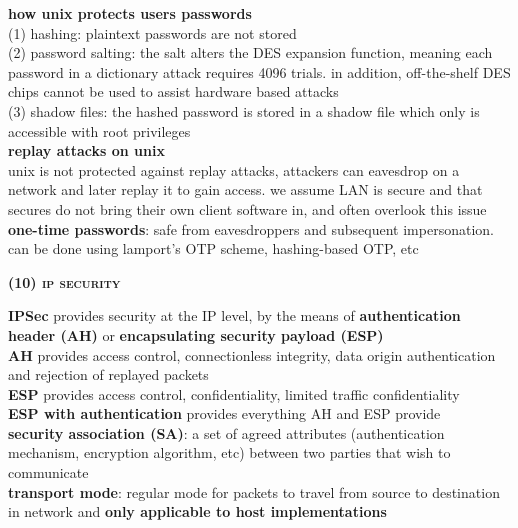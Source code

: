 \documentclass[a4paper]{article}
\begin{document}
\begin{multicols}{2}
\begin{framed}
	\noindent
	\textbf{how unix protects users passwords}\\
	(1) hashing: plaintext passwords are not stored\\
	(2) password salting: the salt alters the DES expansion function, meaning each password in a dictionary attack requires 4096 trials. in addition, off-the-shelf DES chips cannot be used to assist hardware based attacks\\
	(3) shadow files: the hashed password is stored in a shadow file which only is accessible with root privileges\\
	
	\noindent
	\textbf{replay attacks on unix}\\
	unix is not protected against replay attacks, attackers can eavesdrop on a network and later replay it to gain access. we assume LAN is secure and that secures do not bring their own client software in, and often overlook this issue\\
	
	\noindent
	\textbf{one-time passwords}: safe from eavesdroppers and subsequent impersonation. can be done using lamport's OTP scheme, hashing-based OTP, etc
\end{framed}

\begin{framed}
	\begin{center}
		\textbf{\textsc{(10) ip security}}
	\end{center}
	
	\noindent
	\textbf{IPSec} provides security at the IP level, by the means of \textbf{authentication header (AH)} or \textbf{encapsulating security payload (ESP)}\\
	
	\noindent
	\textbf{AH} provides access control, connectionless integrity, data origin authentication and rejection of replayed packets\\
	\textbf{ESP} provides access control, confidentiality, limited traffic confidentiality\\
	\textbf{ESP with authentication} provides everything AH and ESP provide\\
	
	\noindent
	\textbf{security association (SA)}: a set of agreed attributes (authentication mechanism, encryption algorithm, etc) between two parties that wish to communicate\\
	
	\noindent
	\textbf{transport mode}: regular mode for packets to travel from source to destination in network and \textbf{only applicable to host implementations}\\
	

\end{framed}
\end{multicols}
\end{document}
